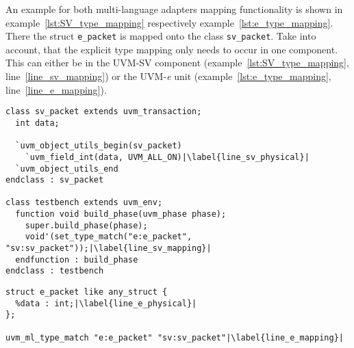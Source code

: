 An example for both multi-language adapters mapping functionality is shown in example~\ref{lst:SV_type_mapping}
respectively example~\ref{lst:e_type_mapping}. There the struct \lstinline$e_packet$ is mapped onto the class
\lstinline$sv_packet$. Take into account, that the explicit type mapping only needs to occur in one component. This can either be in
the UVM-SV component (example~\ref{lst:SV_type_mapping}, line~\ref{line_sv_mapping}) or the
UVM-\textit{e} unit (example~\ref{lst:e_type_mapping}, line~\ref{line_e_mapping}).

\lstset{language=SystemVerilog, numbers = left, escapechar=|, breaklines=true}
\begin{lstlisting}[frame=htrbl, caption={SystemVerilog: mapping \lstinline$sv_packet$ onto \lstinline$e_packet$},
label={lst:SV_type_mapping}]
class sv_packet extends uvm_transaction;
  int data;
  
  `uvm_object_utils_begin(sv_packet)
    `uvm_field_int(data, UVM_ALL_ON)|\label{line_sv_physical}|
  `uvm_object_utils_end
endclass : sv_packet

class testbench extends uvm_env;
  function void build_phase(uvm_phase phase);
    super.build_phase(phase);
    void'(set_type_match("e:e_packet", "sv:sv_packet"));|\label{line_sv_mapping}|
  endfunction : build_phase
endclass : testbench
\end{lstlisting}

\lstset{language=e, numbers = left, escapechar=|, breaklines=true}
\begin{lstlisting}[frame=htrbl, caption={\textit{e}: mapping \lstinline$sv_packet$ onto \lstinline$e_packet$},
label={lst:e_type_mapping}]
struct e_packet like any_struct {
  %data : int;|\label{line_e_physical}|
};

uvm_ml_type_match "e:e_packet" "sv:sv_packet"|\label{line_e_mapping}|
\end{lstlisting}

